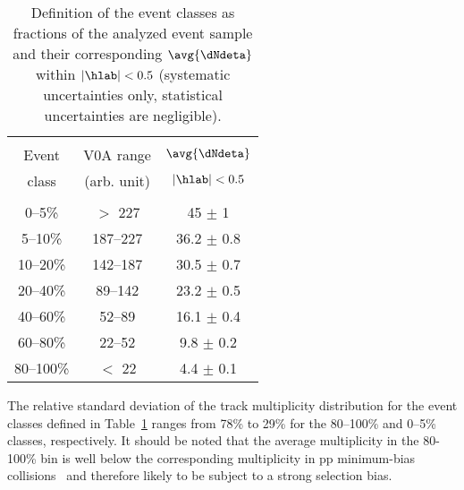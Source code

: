 \begin{table}[t]
  \centering
  \begin{tabular*}{\linewidth}{@{\extracolsep{\fill}}ccc}
    \hline
    &&\\[-0.7em]
     Event & V0A range & $\avg{\dNdeta}$\\
     class & \footnotesize{(arb. unit)} & \footnotesize{$|\hlab|<0.5$}\\[0.3em]
    \hline
    &&\\[-0.7em]
    0--5\%    & $>$ 227  & 45   $\pm$ 1   \\[0.3em]
    5--10\%   & 187--227 & 36.2 $\pm$ 0.8 \\[0.3em]
    10--20\%  & 142--187 & 30.5 $\pm$ 0.7 \\[0.3em]
    20--40\%  & 89--142  & 23.2 $\pm$ 0.5 \\[0.3em]
    40--60\%  & 52--89   & 16.1 $\pm$ 0.4 \\[0.3em]
    60--80\%  & 22--52   & 9.8  $\pm$ 0.2 \\[0.3em]
    80--100\% & $<$ 22   & 4.4  $\pm$ 0.1 \\[0.3em]
    \hline
  \end{tabular*}
  \caption{Definition of the event classes as fractions of the analyzed event sample and their corresponding $\avg{\dNdeta}$ within $|\hlab|<0.5$ (systematic uncertainties only, statistical uncertainties are negligible). }
  \label{tab:multclasses}
\end{table}


The relative standard deviation of the track multiplicity
distribution for the event classes defined in
Table~\ref{tab:multclasses} ranges from 78\% to 29\% for
the 80--100\% and 0--5\% classes, respectively. It should be noted
that the average multiplicity in the 80-100\% bin is well below the
corresponding multiplicity in pp minimum-bias
collisions~\cite{Aamodt:1260702} and therefore likely to be subject to
a strong selection bias.

